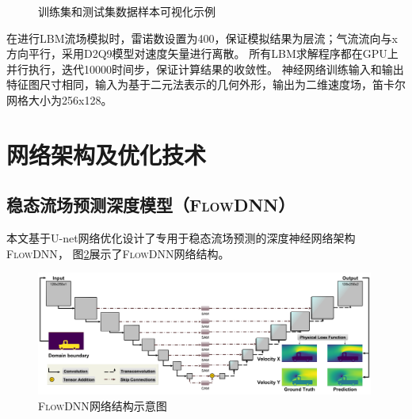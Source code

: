 \begin{figure}[htb]
	\centering
	 \qquad
	\caption{训练集和测试集数据样本可视化示例}
	\label{fig:sample}
\end{figure}

在进行LBM流场模拟时，雷诺数设置为400，保证模拟结果为层流；气流流向与x方向平行，采用D2Q9模型对速度矢量进行离散。
所有LBM求解程序都在GPU上并行执行，迭代10000时间步，保证计算结果的收敛性。
神经网络训练输入和输出特征图尺寸相同，输入为基于二元法表示的几何外形，输出为二维速度场，笛卡尔网格大小为256x128。

\section{网络架构及优化技术}



\subsection{稳态流场预测深度模型（\textsc{FlowDNN}）}
本文基于U-net网络优化设计了专用于稳态流场预测的深度神经网络架构\textsc{FlowDNN}，
图\ref{fig:flowdnn}展示了\textsc{FlowDNN}网络结构。


\begin{figure}[htp]
	\centering
	\includegraphics[width=0.99\textwidth]{figures/data/architecture.pdf}
	\caption{\textsc{FlowDNN}网络结构示意图}
	\label{fig:flowdnn}
\end{figure}

